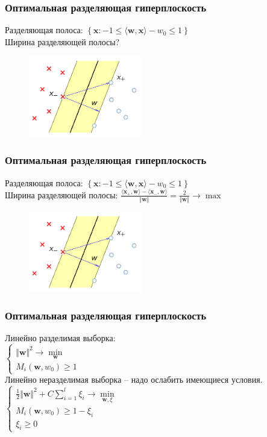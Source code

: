 \documentclass[12pt]{beamer}
\begin{document}
\begin{frame}\frametitle{Оптимальная разделяющая гиперплоскость}
Разделяющая полоса: $\left\{\mathbf{x}: -1 \leq \langle \mathbf{w}, \mathbf{x}\rangle - w_0 \leq 1\right\}$\\
Ширина разделяющей полосы?
\begin{figure}[htbp]
  \includegraphics[height=100pt, keepaspectratio = true]{images/linearly_separable}   
\end{figure}
\end{frame}

\begin{frame}\frametitle{Оптимальная разделяющая гиперплоскость}
Разделяющая полоса: $\left\{\mathbf{x}: -1 \leq \langle \mathbf{w}, \mathbf{x}\rangle - w_0 \leq 1\right\}$\\
Ширина разделяющей полосы: $\frac{\langle \mathbf{x_{+}}, \mathbf{w} \rangle - \langle \mathbf{x_{-}}, \mathbf{w} \rangle}{\Vert \mathbf{w} \Vert} = \frac{2}{\Vert \mathbf{w} \Vert} \rightarrow \max$\\

\begin{figure}[htbp]
  \includegraphics[height=100pt, keepaspectratio = true]{images/linearly_separable}   
\end{figure}
\end{frame}

\begin{frame}\frametitle{Оптимальная разделяющая гиперплоскость}
Линейно разделимая выборка:\\
$\begin{cases}
{\Vert \mathbf{w} \Vert^2 \rightarrow \min\limits_{\mathbf{w}}}\\
M_i(\mathbf{w}, w_0) \geq 1
\end{cases}$\\
Линейно неразделимая выборка -- надо ослабить имеющиеся условия.\\
$\begin{cases}
{\frac{1}{2}\Vert \mathbf{w} \Vert^2 + C \sum\limits_{i=1}^l \xi_i \rightarrow \min\limits_{\mathbf{w}, \xi}}\\
M_i(\mathbf{w}, w_0) \geq 1 - \xi_i\\
\xi_i \geq 0
\end{cases}$\\
\end{frame}
\end{document}
